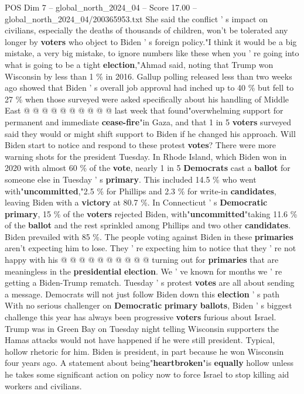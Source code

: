 \begin{textsample}{POS Dim 7 – global\_north\_2024\_04 – Score 17.00 – global\_north\_2024\_04/200365953.txt}
She said the conflict ' s impact on civilians, especially the deaths of thousands of children, won't be tolerated any longer by \textbf{voters} who object to Biden ' s foreign policy."I think it would be a big mistake, a very big mistake, to ignore numbers like these when you ' re going into what is going to be a tight \textbf{election},"Ahmad said, noting that Trump won Wisconsin by less than 1 \% in 2016.
Gallup polling released less than two weeks ago showed that Biden ' s overall job approval had inched up to 40 \% but fell to 27 \% when those surveyed were asked specifically about his handling of Middle East @ @ @ @ @ @ @ @ @ @ last week that found"overwhelming support for permanent and immediate \textbf{cease-fire}"in Gaza, and that 1 in 5 \textbf{voters} surveyed said they would or might shift support to Biden if he changed his approach.
Will Biden start to notice and respond to these protest \textbf{votes}?
There were more warning shots for the president Tuesday.
In Rhode Island, which Biden won in 2020 with almost 60 \% of the \textbf{vote}, nearly 1 in 5 \textbf{Democrats} cast a \textbf{ballot} for someone else in Tuesday ' s \textbf{primary}.
This included 14.5 \% who went with"\textbf{uncommitted},"2.5 \% for Phillips and 2.3 \% for write-in \textbf{candidates}, leaving Biden with a \textbf{victory} at 80.7 \%.
In Connecticut ' s \textbf{Democratic} \textbf{primary}, 15 \% of the \textbf{voters} rejected Biden, with"\textbf{uncommitted}"taking 11.6 \% of the \textbf{ballot} and the rest sprinkled among Phillips and two other \textbf{candidates}.
Biden prevailed with 85 \%.
The people voting against Biden in these \textbf{primaries} aren't expecting him to lose.
They ' re expecting him to notice that they ' re not happy with his @ @ @ @ @ @ @ @ @ @ turning out for \textbf{primaries} that are meaningless in the \textbf{presidential} \textbf{election}.
We ' ve known for months we ' re getting a Biden-Trump rematch.
Tuesday ' s protest \textbf{votes} are all about sending a message.
Democrats will not just follow Biden down this \textbf{election} ' s path With no serious challenger on \textbf{Democratic} \textbf{primary} \textbf{ballots}, Biden ' s biggest challenge this year has always been progressive \textbf{voters} furious about Israel.
Trump was in Green Bay on Tuesday night telling Wisconsin supporters the Hamas attacks would not have happened if he were still president.
Typical, hollow rhetoric for him.
Biden is president, in part because he won Wisconsin four years ago.
A statement about being"\textbf{heartbroken}"is \textbf{equally} hollow unless he takes some significant action on policy now to force Israel to stop killing aid workers and civilians.

\end{textsample}
